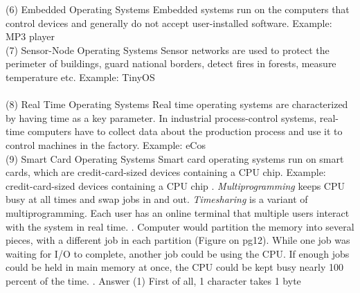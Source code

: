 \documentclass[12pt]{article}
\begin{document}
(6) Embedded Operating Systems\hfill  \break
Embedded systems run on the computers that control devices and generally do not accept user-installed software. \hfill  \break
Example: MP3 player\hfill  \break \\
(7) Sensor-Node Operating Systems\hfill  \break
Sensor networks are used to protect the perimeter of buildings, guard national borders, detect fires in forests, measure temperature etc. \hfill  \break
Example: TinyOS\hfill  \break \\ \\
(8) Real Time Operating Systems\hfill  \break
Real time operating systems are characterized by having time as a key parameter. In industrial process-control systems, real-time computers have to collect data about the production process and use it to control machines in the factory. \hfill  \break
Example: eCos\hfill  \break \\
(9) Smart Card Operating Systems\hfill  \break
Smart card operating systems run on smart cards, which are credit-card-sized devices containing a CPU chip. \hfill  \break
Example: credit-card-sized devices containing a CPU chip\hfill  \break
{}. \textit{Multiprogramming} keeps CPU busy at all times and swap jobs in and out.\hfill  \break
\textit{Timesharing} is a variant of multiprogramming. Each user has an online terminal that multiple users interact with the system in real time. \hfill  \break
{}. Computer would partition the memory into several pieces, with a different job in each partition (Figure on pg12). While one job was waiting for I/O to complete, another job could be using the CPU. If enough jobs could be held in main memory at once, the CPU could be kept busy nearly 100 percent of the time. \hfill  \break
{}. Answer \hfill \break
(1) First of all, 1 character takes 1 byte \hfill \break
\end{document}
